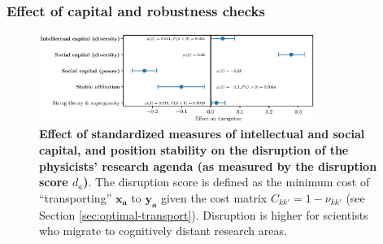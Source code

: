 \documentclass{article}
\begin{document}
\subsubsection{\label{appendix:robustness}Effect of capital and robustness checks}


\begin{figure}[H]
    \centering
    \includegraphics[width=0.8\textwidth]{plots/disruption_score_effects_entropy_magnitude.eps}
    \caption{\textbf{Effect of standardized measures of intellectual and social capital, and position stability on the disruption of the physicists' research agenda (as measured by the disruption score $d_a$)}. The disruption score is defined as the minimum cost of ``transporting'' $\bm{x_a}$ to $\bm{y_a}$ given the cost matrix $C_{kk'}=1-\nu_{kk'}$ (see Section \ref{sec:optimal-transport}). Disruption is higher for scientists who migrate to cognitively distant research areas.}
    \label{fig:disruption_score_effect}
\end{figure}





\end{document}
